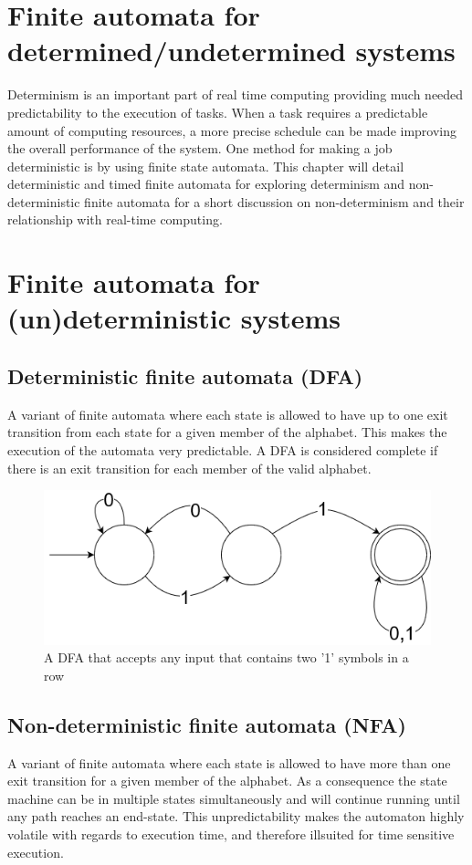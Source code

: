 \section{Finite automata for determined/undetermined systems} \label{sc:determinism}

Determinism is an important part of real time computing providing much needed predictability to the execution of tasks. When a task requires a predictable amount of computing resources, a more precise schedule can be made improving the overall performance of the system. One method for making a job deterministic is by using finite state automata. This chapter will detail deterministic and timed finite automata for exploring determinism and non-deterministic finite automata for a short discussion on non-determinism and their relationship with real-time computing. 

\section{Finite automata for (un)deterministic systems}

\subsection{Deterministic finite automata (DFA)}
A variant of finite automata where each state is allowed to have up to one exit transition from each state for a given member of the alphabet. This makes the execution of the automata very predictable. A DFA is considered complete if there is an exit transition for each member of the valid alphabet. 

\begin{figure}[h!]\label{}
    \centering
    \includegraphics[scale=0.5]{realTimeComputing/fig/DFA.png}
    \caption{A DFA that accepts any input that contains two '1' symbols in a row}
    \label{fig:dfaSample}
\end{figure}

\subsection{Non-deterministic finite automata (NFA)}
A variant of finite automata where each state is allowed to have more than one exit transition for a given member of the alphabet. As a consequence the state machine can be in multiple states simultaneously and will continue running until any path reaches an end-state. This unpredictability makes the automaton highly volatile with regards to execution time, and therefore illsuited for time sensitive execution.\par

